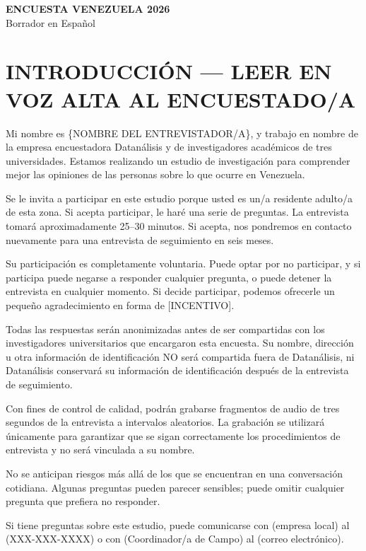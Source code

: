 \documentclass[11pt,letterpaper]{article}
\begin{document}
\begin{center}
{\Large \textbf{ENCUESTA VENEZUELA 2026}}\\
\vspace{0.3em}
{\large Borrador en Español}\\
\vspace{0.5em}
\end{center}

\section*{INTRODUCCIÓN — LEER EN VOZ ALTA AL ENCUESTADO/A}

Mi nombre es \{NOMBRE DEL ENTREVISTADOR/A\}, y trabajo en nombre de la empresa encuestadora Datanálisis y de investigadores académicos de tres universidades. Estamos realizando un estudio de investigación para comprender mejor las opiniones de las personas sobre lo que ocurre en Venezuela.

Se le invita a participar en este estudio porque usted es un/a residente adulto/a de esta zona. Si acepta participar, le haré una serie de preguntas. La entrevista tomará aproximadamente 25–30 minutos. Si acepta, nos pondremos en contacto nuevamente para una entrevista de seguimiento en seis meses.

Su participación es completamente voluntaria. Puede optar por no participar, y si participa puede negarse a responder cualquier pregunta, o puede detener la entrevista en cualquier momento. Si decide participar, podemos ofrecerle un pequeño agradecimiento en forma de [INCENTIVO].

Todas las respuestas serán anonimizadas antes de ser compartidas con los investigadores universitarios que encargaron esta encuesta. Su nombre, dirección u otra información de identificación NO será compartida fuera de Datanálisis, ni Datanálisis conservará su información de identificación después de la entrevista de seguimiento.

Con fines de control de calidad, podrán grabarse fragmentos de audio de tres segundos de la entrevista a intervalos aleatorios. La grabación se utilizará únicamente para garantizar que se sigan correctamente los procedimientos de entrevista y no será vinculada a su nombre.

No se anticipan riesgos más allá de los que se encuentran en una conversación cotidiana. Algunas preguntas pueden parecer sensibles; puede omitir cualquier pregunta que prefiera no responder.

Si tiene preguntas sobre este estudio, puede comunicarse con (empresa local) al (XXX-XXX-XXXX) o con (Coordinador/a de Campo) al (correo electrónico).
\end{document}
